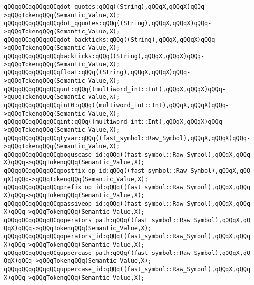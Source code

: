 \verb|qQQqqQQqqQQqqQQqdot_quotes:qQQq((String),qQQqX,qQQqX)qQQq->qQQqTokenqQQq(Semantic_Value,X);|\newline
\verb|qQQqqQQqqQQqqQQqdot_qquotes:qQQq((String),qQQqX,qQQqX)qQQq->qQQqTokenqQQq(Semantic_Value,X);|\newline
\verb|qQQqqQQqqQQqqQQqdot_backticks:qQQq((String),qQQqX,qQQqX)qQQq->qQQqTokenqQQq(Semantic_Value,X);|\newline
\verb|qQQqqQQqqQQqqQQqbackticks:qQQq((String),qQQqX,qQQqX)qQQq->qQQqTokenqQQq(Semantic_Value,X);|\newline
\verb|qQQqqQQqqQQqqQQqfloat:qQQq((String),qQQqX,qQQqX)qQQq->qQQqTokenqQQq(Semantic_Value,X);|\newline
\verb|qQQqqQQqqQQqqQQqunt:qQQq((multiword_int::Int),qQQqX,qQQqX)qQQq->qQQqTokenqQQq(Semantic_Value,X);|\newline
\verb|qQQqqQQqqQQqqQQqint0:qQQq((multiword_int::Int),qQQqX,qQQqX)qQQq->qQQqTokenqQQq(Semantic_Value,X);|\newline
\verb|qQQqqQQqqQQqqQQqint:qQQq((multiword_int::Int),qQQqX,qQQqX)qQQq->qQQqTokenqQQq(Semantic_Value,X);|\newline
\verb|qQQqqQQqqQQqqQQqtyvar:qQQq((fast_symbol::Raw_Symbol),qQQqX,qQQqX)qQQq->qQQqTokenqQQq(Semantic_Value,X);|\newline
\verb|qQQqqQQqqQQqqQQqboguscase_id:qQQq((fast_symbol::Raw_Symbol),qQQqX,qQQqX)qQQq->qQQqTokenqQQq(Semantic_Value,X);|\newline
\verb|qQQqqQQqqQQqqQQqpostfix_op_id:qQQq((fast_symbol::Raw_Symbol),qQQqX,qQQqX)qQQq->qQQqTokenqQQq(Semantic_Value,X);|\newline
\verb|qQQqqQQqqQQqqQQqprefix_op_id:qQQq((fast_symbol::Raw_Symbol),qQQqX,qQQqX)qQQq->qQQqTokenqQQq(Semantic_Value,X);|\newline
\verb|qQQqqQQqqQQqqQQqpassiveop_id:qQQq((fast_symbol::Raw_Symbol),qQQqX,qQQqX)qQQq->qQQqTokenqQQq(Semantic_Value,X);|\newline
\verb|qQQqqQQqqQQqqQQqoperators_path:qQQq((fast_symbol::Raw_Symbol),qQQqX,qQQqX)qQQq->qQQqTokenqQQq(Semantic_Value,X);|\newline
\verb|qQQqqQQqqQQqqQQqoperators_id:qQQq((fast_symbol::Raw_Symbol),qQQqX,qQQqX)qQQq->qQQqTokenqQQq(Semantic_Value,X);|\newline
\verb|qQQqqQQqqQQqqQQquppercase_path:qQQq((fast_symbol::Raw_Symbol),qQQqX,qQQqX)qQQq->qQQqTokenqQQq(Semantic_Value,X);|\newline
\verb|qQQqqQQqqQQqqQQquppercase_id:qQQq((fast_symbol::Raw_Symbol),qQQqX,qQQqX)qQQq->qQQqTokenqQQq(Semantic_Value,X);|\newline
